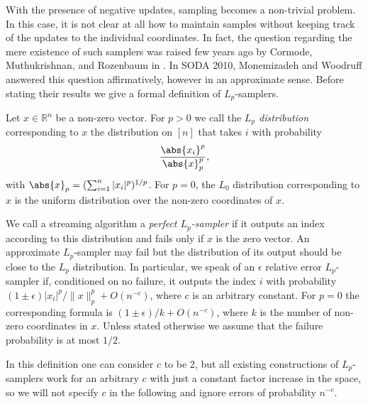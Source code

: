 With the presence of negative updates, sampling becomes a
non-trivial problem. In this case, it is not clear at all how to
maintain samples without keeping track of the updates to the
individual coordinates. In fact, the question regarding the mere
existence of such samplers was raised few years ago by Cormode,
Muthukrishnan, and Rozenbaum in \cite{CormodeMR2005}. In SODA
2010, Monemizadeh and Woodruff \cite{MonemizadehW2010} answered
this question affirmatively, however in an approximate sense.
Before stating their results we give a formal definition of
$L_p$-samplers.

\begin{definition}
Let $x \in \mathbb{R}^n$ be a non-zero vector. For $p>0$ we call
the {\em $L_p$ distribution} corresponding to $x$ the
distribution on $[n]$ that takes $i$ with probability
\begin{align*}
  \frac{\abs{x_i}^p}{\abs{x}_p^p},
\end{align*}
with $\abs{x}_p=(\sum_{i=1}^n|x_i|^p)^{1/p}$. For $p=0$, 
the $L_0$ distribution corresponding to $x$ is the uniform 
distribution over the non-zero coordinates of $x$.
\end{definition}

We call a streaming algorithm a {\em perfect $L_p$-sampler} if
it outputs an index according to this distribution and fails
only if $x$ is the zero vector. An approximate $L_p$-sampler may
fail but the distribution of its output should be close to the
$L_p$ distribution. In particular, we speak of an $\epsilon$
relative error $L_p$-sampler if, conditioned on no failure, it
outputs the index $i$ with probability
$(1\pm\epsilon)|x_i|^p/\|x\|_p^p+O(n^{-c})$, where $c$ is an
arbitrary constant. For $p=0$ the corresponding formula is
$(1\pm\epsilon)/k+O(n^{-c})$, where $k$ is the number of
non-zero coordinates in $x$. Unless stated otherwise we assume
that the failure probability is at most $1/2$.

In this definition one can consider $c$ to be 2, but all
existing constructions of $L_p$-samplers work for an arbitrary
$c$ with just a constant factor increase in the space, so we
will not specify $c$ in the following and ignore errors of
probability $n^{-c}$.
 

